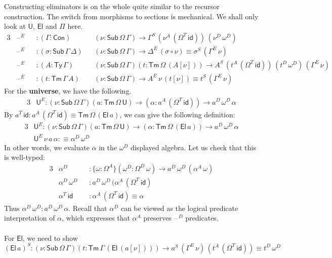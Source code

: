 \documentclass[12pt,a4paper,twoside,openany]{book}
\theoremstyle{remark}
\theoremstyle{definition}
\theoremstyle{theorem}
\newcommand{\id}{\mathsf{id}}
\newcommand{\Con}{\mathsf{Con}}
\newcommand{\Sub}{\mathsf{Sub}}
\newcommand{\Tm}{\mathsf{Tm}}
\newcommand{\Ty}{\mathsf{Ty}}
\newcommand{\U}{\mathsf{U}}
\newcommand{\El}{\mathsf{El}}
\newcommand{\blank}{\mathord{\hspace{1pt}\text{--}\hspace{1pt}}}
\newcommand{\defn}{:\equiv}
\begin{document}
Constructing eliminators is on the whole quite similar to the recursor
construction. The switch from morphisms to sections is mechanical. We shall only
look at $\U$, $\El$ and $\Pi$ here.
\begin{alignat*}{3}
  &\blank^E &&: (\Gamma : \Con)&&(\nu : \Sub\,\Omega\,\Gamma) \to \Gamma^S\,(\nu^A\,(\Omega^T\,\id))\,(\nu^D\,\omega^D)\\
  &\blank^E &&: (\sigma : \Sub\,\Gamma\,\Delta)&&(\nu : \Sub\,\Omega\,\Gamma) \to \Delta^E\,(\sigma \circ \nu) \equiv \sigma^S\,(\Gamma^E\,\nu)\\
  &\blank^E &&: (A : \Ty\,\Gamma)&&(\nu : \Sub\,\Omega\,\Gamma)(t : \Tm\,\Omega\,(A[\nu]))
     \to A^S\,(t^A\,(\Omega^T\,\id))\,(t^D\,\omega^D)\,(\Gamma^E\,\nu)\\
  &\blank^E &&: (t : \Tm\,\Gamma\,A)&&(\nu : \Sub\,\Omega\,\Gamma) \to A^E\,\nu\,(t[\nu]) \equiv t^S\,(\Gamma^E\,\nu)
\end{alignat*}
For the \textbf{universe}, we have the following.
\begin{alignat*}{3}
  &\U^E : (\nu : \Sub\,\Omega\,\Gamma)(a : \Tm\,\Omega\,\U) \to (\alpha : a^A\,(\Omega^T\,\id)) \to a^D\,\omega^D\,\alpha
\end{alignat*}
By $a^T\,\id : a^A\,(\Omega^T\,\id) \equiv \Tm\,\Omega\,(\El\,a)$, we can give the following definition:
\begin{alignat*}{3}
  &\U^E : (\nu : \Sub\,\Omega\,\Gamma)(a : \Tm\,\Omega\,\U) \to (\alpha : \Tm\,\Omega\,(\El\,a)) \to a^D\,\omega^D\,\alpha\\
  &\U^E\,\nu\,a\,\alpha \defn \alpha^D\,\omega^D
\end{alignat*}
In other words, we evaluate $\alpha$ in the $\omega^D$ displayed algebra. Let us check that this is well-typed:
\begin{alignat*}{3}
  & \alpha^D &&: \{\omega : \Omega^A\}(\omega^D : \Omega^D\,\omega) \to a^D\,\omega^D\,(\alpha^A\,\omega)\\
  & \alpha^D\,\omega^D &&: a^D\,\omega^D\,(\alpha^A\,(\Omega^T\,\id) \\
  & \alpha^T\,\id      &&: \alpha^A\,(\Omega^T\,\id) \equiv \alpha
\end{alignat*}
Thus $\alpha^D\,\omega^D : a^D\,\omega^D\,\alpha$. Recall that $\alpha^D$ can
be viewed as the logical predicate interpretation of $\alpha$, which expresses
that $\alpha^A$ preserves $\blank^D$ predicates.
\\\\
\noindent For \textbf{$\El$}, we need to show
\[
  (\El\,a)^S : (\nu : \Sub\,\Omega\,\Gamma)(t : \Tm\,\Gamma\,(\El\,(a[\nu]))) \to a^S\,(\Gamma^E\,\nu)\,(t^A\,(\Omega^T\,\id)) \equiv t^D\,\omega^D
\]
\end{document}
